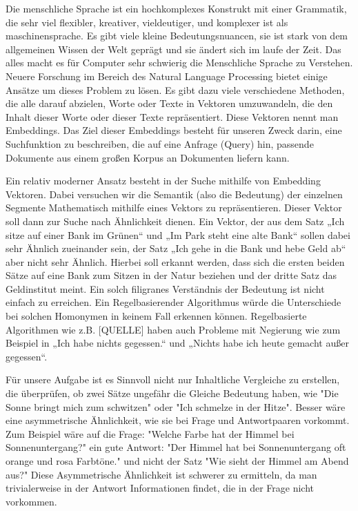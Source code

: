 Die menschliche Sprache ist ein hochkomplexes Konstrukt mit einer Grammatik, die sehr viel flexibler, kreativer, vieldeutiger, und komplexer ist als maschinensprache. 
Es gibt viele kleine Bedeutungsnuancen, sie ist stark von dem allgemeinen Wissen der Welt geprägt und sie ändert sich im laufe der Zeit. 
Das alles macht es für Computer sehr schwierig die Menschliche Sprache zu Verstehen. 
Neuere Forschung im Bereich des Natural Language Processing bietet einige Ansätze um dieses Problem zu lösen. 
Es gibt dazu viele verschiedene Methoden, die alle darauf abzielen, Worte oder Texte in Vektoren umzuwandeln, die den Inhalt dieser Worte oder dieser Texte repräsentiert.
Diese Vektoren nennt man Embeddings.
Das Ziel dieser Embeddings besteht für unseren Zweck darin, eine Suchfunktion zu beschreiben, die auf eine Anfrage (Query) hin, passende Dokumente aus einem großen Korpus an Dokumenten liefern kann.

Ein relativ moderner Ansatz besteht in der Suche mithilfe von Embedding Vektoren. 
Dabei versuchen wir die Semantik (also die Bedeutung) der einzelnen Segmente Mathematisch mithilfe eines Vektors zu repräsentieren. 
Dieser Vektor soll dann zur Suche nach Ähnlichkeit dienen. Ein Vektor, der aus dem Satz „Ich sitze auf einer Bank im Grünen“ und „Im Park steht eine alte Bank“ sollen dabei sehr Ähnlich zueinander sein, der Satz „Ich gehe in die Bank und hebe Geld ab“ aber nicht sehr Ähnlich. 
Hierbei soll erkannt werden, dass sich die ersten beiden Sätze auf eine Bank zum Sitzen in der Natur beziehen und der dritte Satz das Geldinstitut meint. 
Ein solch filigranes Verständnis der Bedeutung ist nicht einfach zu erreichen. 
Ein Regelbasierender Algorithmus würde die Unterschiede bei solchen Homonymen in keinem Fall erkennen können. 
Regelbasierte Algorithmen wie z.B. [QUELLE] haben auch Probleme mit Negierung wie zum Beispiel in „Ich habe nichts gegessen.“ und „Nichts habe ich heute gemacht außer gegessen“.

Für unsere Aufgabe ist es Sinnvoll nicht nur Inhaltliche Vergleiche zu erstellen, die überprüfen, ob zwei Sätze ungefähr die Gleiche Bedeutung haben, wie "Die Sonne bringt mich zum schwitzen" oder "Ich schmelze in der Hitze".
Besser wäre eine asymmetrische Ähnlichkeit, wie sie bei Frage und Antwortpaaren vorkommt.
Zum Beispiel wäre auf die Frage: "Welche Farbe hat der Himmel bei Sonnenuntergang?" ein gute Antwort: "Der Himmel hat bei Sonnenuntergang oft orange und rosa Farbtöne."  und nicht der Satz "Wie sieht der Himmel am Abend aus?"
Diese Asymmetrische Ähnlichkeit ist schwerer zu ermitteln, da man trivialerweise in der Antwort Informationen findet, die in der Frage nicht vorkommen.

